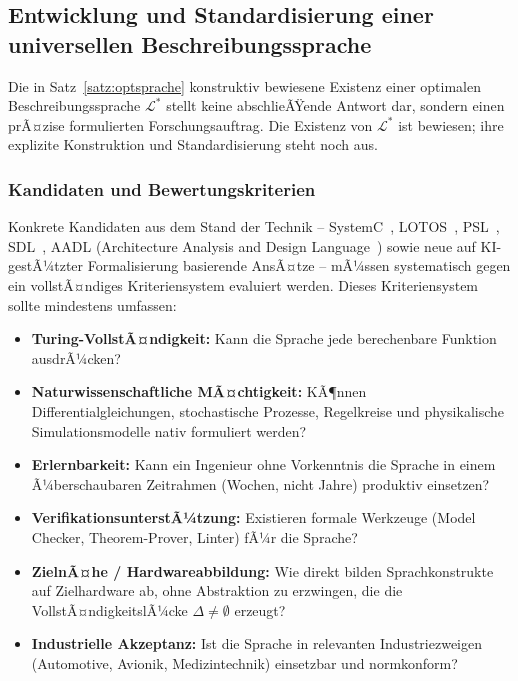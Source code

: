 ﻿\documentclass[a4paper,12pt]{article}
\theoremstyle{definition}
\begin{document}
\subsection{Entwicklung und Standardisierung einer universellen Beschreibungssprache}

Die in Satz~\ref{satz:optsprache} konstruktiv bewiesene Existenz einer optimalen
Beschreibungssprache $\mathcal{L}^*$ stellt keine abschlieÃŸende Antwort dar, sondern
einen prÃ¤zise formulierten Forschungsauftrag. Die Existenz von $\mathcal{L}^*$ ist
bewiesen; ihre explizite Konstruktion und Standardisierung steht noch aus.

\subsubsection{Kandidaten und Bewertungskriterien}

Konkrete Kandidaten aus dem Stand der Technik -- SystemC~\cite{systemc2012},
LOTOS~\cite{lotos1988}, PSL~\cite{psl2005}, SDL~\cite{sdl2000}, AADL (Architecture
Analysis and Design Language~\cite{aadl2004}) sowie neue auf KI-gestÃ¼tzter
Formalisierung basierende AnsÃ¤tze -- mÃ¼ssen systematisch gegen ein vollstÃ¤ndiges
Kriteriensystem evaluiert werden. Dieses Kriteriensystem sollte mindestens umfassen:

\begin{itemize}
  \item \textbf{Turing-VollstÃ¤ndigkeit:} Kann die Sprache jede berechenbare Funktion ausdrÃ¼cken?
  \item \textbf{Naturwissenschaftliche MÃ¤chtigkeit:} KÃ¶nnen Differentialgleichungen,
        stochastische Prozesse, Regelkreise und physikalische Simulationsmodelle nativ
        formuliert werden?
  \item \textbf{Erlernbarkeit:} Kann ein Ingenieur ohne Vorkenntnis die Sprache in einem
        Ã¼berschaubaren Zeitrahmen (Wochen, nicht Jahre) produktiv einsetzen?
  \item \textbf{VerifikationsunterstÃ¼tzung:} Existieren formale Werkzeuge
        (Model Checker, Theorem-Prover, Linter) fÃ¼r die Sprache?
  \item \textbf{ZielnÃ¤he / Hardwareabbildung:} Wie direkt bilden Sprachkonstrukte
        auf Zielhardware ab, ohne Abstraktion zu erzwingen, die die VollstÃ¤ndigkeitslÃ¼cke
        $\Delta \neq \emptyset$ erzeugt?
  \item \textbf{Industrielle Akzeptanz:} Ist die Sprache in relevanten Industriezweigen
        (Automotive, Avionik, Medizintechnik) einsetzbar und normkonform?
\end{itemize}
\end{document}
